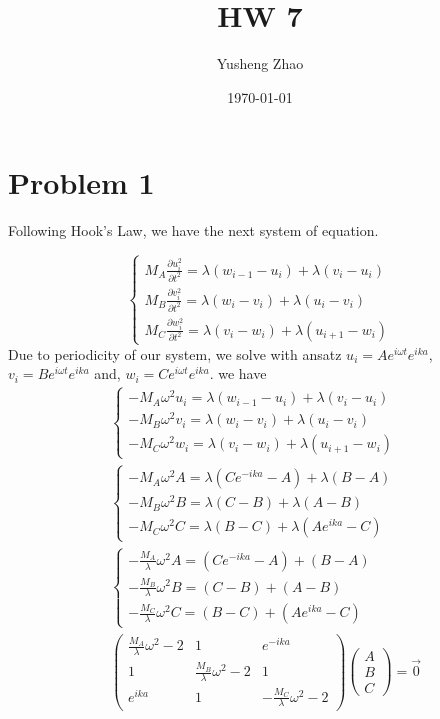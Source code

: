 \documentclass[11pt]{article}
\author{Yusheng Zhao}
\date{\today}
\title{HW 7}
\begin{document}
\maketitle
\tableofcontents


\section{Problem 1}
\label{sec:orgee4383a}
Following Hook's Law, we have the next system of equation.

\begin{equation}
\begin{cases}
M_{A} \frac{\partial u_{i}^{2}}{\partial t^{2}} = \lambda (w_{i-1} - u_{i})+ \lambda (v_{i}-u_{i}) \\
M_{B} \frac{\partial v_{i}^{2}}{\partial t^{2}} = \lambda (w_{i} - v_{i}) + \lambda (u_{i}-v_{i}) \\
M_{C} \frac{\partial w_{i}^{2}}{\partial t^{2}} = \lambda (v_{i} - w_{i}) + \lambda (u_{i+1}-w_{i})
\end{cases}
\end{equation}
Due to periodicity of our system, we solve with ansatz \(u_{i} = A e^{i\omega t}
e^{ik a}\), \(v_{i} = B e^{i\omega t} e^{ika}\) and, \(w_{i} = C e^{i\omega t}
e^{ika}\). we have
\begin{align}
&\begin{cases}
-M_{A} \omega^{2} u_{i} = \lambda (w_{i-1} - u_{i}) + \lambda (v_{i}-u_{i}) \\
-M_{B} \omega^{2} v_{i} = \lambda (w_{i} - v_{i}) + \lambda (u_{i}-v_{i}) \\
-M_{C} \omega^{2} w_{i} = \lambda (v_{i} - w_{i}) + \lambda (u_{i+1}-w_{i})
\end{cases}\\
&\begin{cases}
-M_{A} \omega^{2} A = \lambda (C e^{-ika} - A) + \lambda (B-A) \\
-M_{B} \omega^{2} B = \lambda (C - B) + \lambda (A-B) \\
-M_{C} \omega^{2} C = \lambda (B - C) + \lambda (Ae^{ika}-C)
\end{cases}\\
&\begin{cases}
-\frac{M_{A}}{\lambda} \omega^{2} A = (C e^{-ika} - A) + (B-A) \\
-\frac{M_{B}}{\lambda} \omega^{2} B = (C - B) + (A-B) \\
-\frac{M_{C}}{\lambda} \omega^{2} C = (B - C) + (Ae^{ika}-C)
\end{cases}\\
&\begin{pmatrix}
\frac{M_{A}}{\lambda}\omega^{2} -2 & 1 & e^{-ika} \\
1 & \frac{M_{B}}{\lambda}\omega^{2} - 2 & 1 \\
e^{ika} & 1 & -\frac{M_{C}}{\lambda} \omega^{2} - 2
\end{pmatrix}
\begin{pmatrix}
A \\ B \\ C
\end{pmatrix} = \vec{0}
\end{align}
\end{document}
